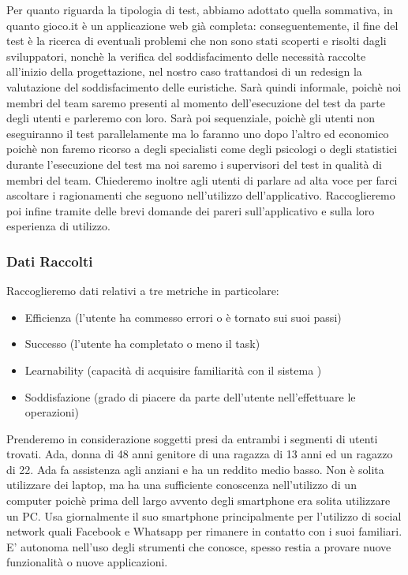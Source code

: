 \documentclass[../Report.tex]{subfiles}
\begin{document}
    Per quanto riguarda la tipologia di test, abbiamo adottato quella sommativa, in quanto gioco.it è un applicazione web già completa: conseguentemente, il fine del test è la ricerca di eventuali problemi che non sono stati scoperti e risolti dagli sviluppatori, nonchè la verifica del soddisfacimento delle necessità raccolte all’inizio della progettazione, nel nostro caso trattandosi di un redesign la valutazione del soddisfacimento delle euristiche. 
    Sarà quindi informale, poichè noi membri del team saremo presenti al momento dell’esecuzione del test da parte degli utenti e parleremo con loro. Sarà poi sequenziale, poichè gli utenti non eseguiranno il test parallelamente ma lo faranno uno dopo l’altro ed economico poichè non faremo ricorso a degli specialisti come degli psicologi o degli statistici durante l’esecuzione del test ma noi saremo i supervisori del test in qualità di membri del team. 
    Chiederemo inoltre agli utenti di parlare ad alta voce per farci ascoltare i ragionamenti che seguono nell’utilizzo dell’applicativo. Raccoglieremo poi infine tramite delle brevi domande dei pareri sull’applicativo e sulla loro esperienza di utilizzo.

    \subsubsection{Dati Raccolti}
    Raccoglieremo dati relativi a tre metriche in particolare:
    \begin{itemize}
        \item Efficienza (l’utente ha commesso errori o è tornato sui suoi passi)
        \item Successo (l’utente ha completato o meno il task)
        \item Learnability (capacità di acquisire familiarità con il sistema )
        \item Soddisfazione (grado di piacere da parte dell’utente nell’effettuare le operazioni)
    \end{itemize}

    Prenderemo in considerazione soggetti presi da entrambi i segmenti di utenti trovati.
    Ada, donna di 48 anni genitore di una ragazza di 13 anni ed un ragazzo di 22. Ada fa assistenza agli anziani e ha un reddito medio basso. Non è solita utilizzare dei laptop, ma ha una sufficiente conoscenza nell’utilizzo di un computer poichè prima dell largo avvento degli smartphone era solita utilizzare un PC. Usa giornalmente il suo smartphone principalmente per l’utilizzo di social network quali Facebook e Whatsapp per rimanere in contatto con i suoi familiari. E’ autonoma nell’uso degli strumenti che conosce, spesso restia a provare nuove funzionalità o nuove applicazioni.\\
\end{document}
